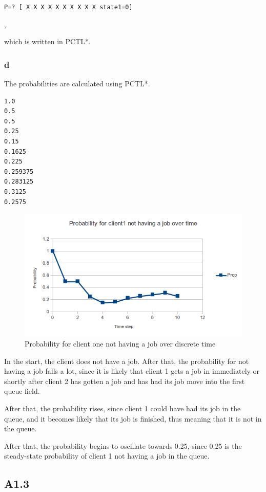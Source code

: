 \begin{verbatim}P=? [ X X X X X X X X X X state1=0]\end{verbatim},

which is written in PCTL*.

\subsubsection{d}

The probabilities are calculated using PCTL*.

\begin{verbatim}
1.0
0.5
0.5
0.25
0.15
0.1625
0.225
0.259375
0.283125
0.3125
0.2575
\end{verbatim}

\begin{figure}[!htb]
\centering
\includegraphics[scale=.75]{images/chart_client1_nojob_time_prop.png}
\caption{Probability for client one not having a job over discrete time}
\label{fig:nojobprop}
\end{figure}

In the start, the client does not have a job.
After that, the probability for not having a job falls a lot,
since it is likely that client 1 gets a job in immediately
or shortly after client 2 has gotten a job and has had its
job move into the first queue field.

After that, the probability rises, since client 1 could
have had its job in the queue, and it becomes likely that
its job is finished, thus meaning that it is not in the queue.

After that, the probability begins to oscillate towards 0.25,
since 0.25 is the steady-state probability of client 1 not having a job in the queue.

\subsection{A1.3}

